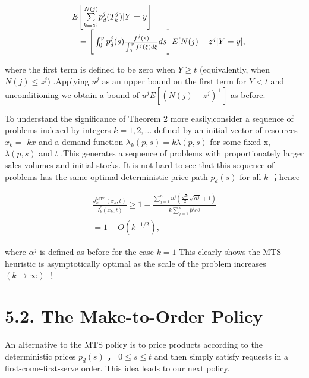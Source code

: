 \[
\begin{array} { r l } & { E \Bigg [ \underset { k = z ^ { j } } { \overset { N ( j ) } { \sum } } p _ { d } ^ { j } ( T _ { k } ^ { j } ) | Y = y \Bigg ] } \\ & { \quad = \Bigg [ \int _ { 0 } ^ { y } p _ { d } ^ { j } ( s ) \frac { f ^ { j } ( s ) } { \int _ { 0 } ^ { y } f ^ { j } ( \xi ) d \xi } d s \Bigg ] E [ N ( j ) - z ^ { j } | Y = y ] , } \end{array}
\]

where the first term is defined to be zero when \(Y \geqslant t\)
(equivalently, when \(N ( j ) \leqslant z ^ { j } )\) .Applying
\(u ^ { j }\) as an upper bound on the first term for \(Y < t\) and
unconditioning we obtain a bound of
\(u ^ { j } E [ ( N ( j ) - z ^ { j } ) ^ { + } ]\) as before.

To understand the significance of Theorem 2 more easily,consider a
sequence of problems indexed by integers \(k = 1 , 2 , \dots\) defined
by an initial vector of resources \(x _ { k } =\) \(k x\) and a demand
function \(\lambda _ { k } ( p , s ) = k \lambda ( p , s )\) for some
fixed x, \(\lambda ( p , s )\) and \(t\) .This generates a sequence of
problems with proportionately larger sales volumes and initial stocks.
It is not hard to see that this sequence of problems has the same
optimal deterministic price path \(p _ { d } ( s )\) for all \(k\)
；hence

\[
\begin{array} { l } { \displaystyle \frac { J _ { k } ^ { \mathrm { M T S } } ( x _ { k } , t ) } { J _ { k } ^ { * } ( x _ { k } , t ) } \geqslant 1 - \frac { \sum _ { j = 1 } ^ { n } u ^ { j } \left( \frac { \sqrt { k } } { 2 } \sqrt { \alpha ^ { j } } + 1 \right) } { k \sum _ { j = 1 } ^ { n } \bar { p } ^ { j } \alpha ^ { j } } } \\ { = 1 - O ( k ^ { - 1 / 2 } ) , } \end{array}
\]

where \(\alpha ^ { j }\) is defined as before for the case \(k = 1\)
This clearly shows the MTS heuristic is asymptotically optimal as the
scale of the problem increases \(( k \to \infty )\) ！

\section{5.2. The Make-to-Order Policy}\label{the-make-to-order-policy}

An alternative to the MTS policy is to price products according to the
deterministic prices \(p _ { d } ( s )\) ，
\(0 \leqslant s \leqslant t\) and then simply satisfy requests in a
first-come-first-serve order. This idea leads to our next policy.

